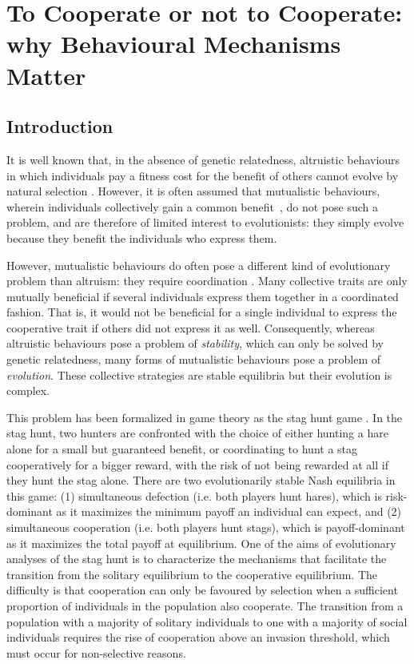 \section{To Cooperate or not to Cooperate: why Behavioural Mechanisms Matter}
  \subsection{Introduction}
    It is well known that, in the absence of genetic relatedness, altruistic behaviours in which individuals pay a fitness cost for the benefit of others cannot evolve by natural selection \cite{Hamilton1964,West2007a}. However, it is often assumed that mutualistic behaviours, wherein individuals collectively gain a common benefit~\cite{Leimar2003, Leimar2010}, do not pose such a problem, and are therefore of limited interest to evolutionists: they simply evolve because they benefit the individuals who express them.

    However, mutualistic behaviours do often pose a different kind of evolutionary problem than altruism: they require coordination \cite{Alvard2001, Alvard2003, Drea2009, Leimar2003}. Many collective traits are only mutually beneficial if several individuals express them together in a coordinated fashion. That is, it would not be beneficial for a single individual to express the cooperative trait if others did not express it as well. Consequently, whereas altruistic behaviours pose a problem of \textit{stability}, which can only be solved by genetic relatedness, many forms of mutualistic behaviours pose a problem of \textit{evolution}. These collective strategies are stable equilibria but their evolution is complex. 

    This problem has been formalized in game theory as the stag hunt game \cite{Skyrms2004}. In the stag hunt, two hunters are confronted with the choice of either hunting a hare alone for a small but guaranteed benefit, or coordinating to hunt a stag cooperatively for a bigger reward, with the risk of not being rewarded at all if they hunt the stag alone. There are two evolutionarily stable Nash equilibria in this game: (1) simultaneous defection (i.e. both players hunt hares), which is risk-dominant as it maximizes the minimum payoff an individual can expect, and (2) simultaneous cooperation (i.e. both players hunt stags), which is payoff-dominant as it maximizes the total payoff at equilibrium. One of the aims of evolutionary analyses of the stag hunt is to characterize the mechanisms that facilitate the transition from the solitary equilibrium to the cooperative equilibrium. The difficulty is that cooperation can only be favoured by selection when a sufficient proportion of individuals in the population also cooperate. The transition from a population with a majority of solitary individuals to one with a majority of social individuals requires the rise of cooperation above an invasion threshold, which must occur for non-selective reasons.

